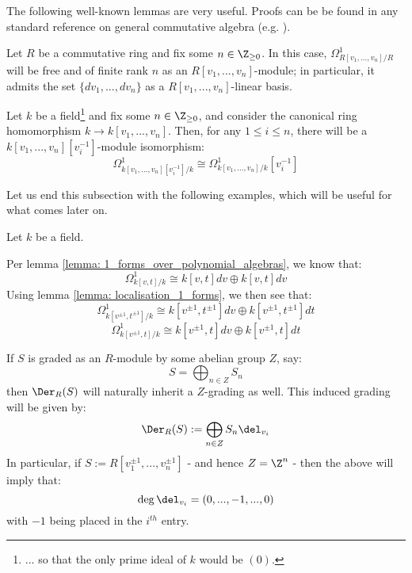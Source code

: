         The following well-known lemmas are very useful. Proofs can be be found in any standard reference on general commutative algebra (e.g. \cite[\href{https://stacks.math.columbia.edu/tag/00AO}{Tag 00AO}]{stacks}).
        \begin{lemma} \label{lemma: 1_forms_over_polynomial_algebras}
            \cite[\href{https://stacks.math.columbia.edu/tag/00RX}{Tag 00RX}]{stacks} Let $R$ be a commutative ring and fix some $n \in \Z_{\geq 0}$. In this case, $\Omega^1_{R[v_1, ..., v_n]/R}$ will be free and of finite rank $n$ as an $R[v_1, ..., v_n]$-module; in particular, it admits the set $\{dv_1, ..., dv_n\}$ as a $R[v_1, ..., v_n]$-linear basis.
        \end{lemma}
        \begin{lemma} \label{lemma: localisation_1_forms}
            \cite[\href{https://stacks.math.columbia.edu/tag/031G}{Tag 031G}]{stacks} Let $k$ be a field\footnote{... so that the only prime ideal of $k$ would be $(0)$.} and fix some $n \in \Z_{\geq 0}$, and consider the canonical ring homomorphism $k \to k[v_1, ..., v_n]$. Then, for any $1 \leq i \leq n$, there will be a $k[v_1, ..., v_n][v_i^{-1}]$-module isomorphism:
                $$\Omega^1_{k[v_1, ..., v_n][v_i^{-1}]/k} \cong \Omega^1_{k[v_1, ..., v_n]/k}[v_i^{-1}]$$
        \end{lemma}

        Let us end this subsection with the following examples, which will be useful for what comes later on.
        \begin{example}
            Let $k$ be a field.
        
            Per lemma \ref{lemma: 1_forms_over_polynomial_algebras}, we know that:
                $$\Omega^1_{k[v, t]/k} \cong k[v, t] dv \oplus k[v, t] dv$$
            Using lemma \ref{lemma: localisation_1_forms}, we then see that:
                $$\Omega^1_{k[v^{\pm 1}, t^{\pm 1}]/k} \cong k[v^{\pm 1}, t^{\pm 1}] dv \oplus k[v^{\pm 1}, t^{\pm 1}] dt$$
                $$\Omega^1_{k[v^{\pm 1}, t]/k} \cong k[v^{\pm 1}, t] dv \oplus k[v^{\pm 1}, t] dt$$
        \end{example}

        \begin{remark} \label{remark: gradings_on_derivations}
            If $S$ is graded as an $R$-module by some abelian group $Z$, say:
                $$S = \bigoplus_{n \in Z} S_n$$
            then $\Der_R(S)$ will naturally inherit a $Z$-grading as well. This induced grading will be given by:
                $$\Der_R(S) := \bigoplus_{n \in Z} S_n \del_{v_i}$$
            In particular, if $S := R[v_1^{\pm 1}, ..., v_n^{\pm 1}]$ - and hence $Z = \Z^n$ - then the above will imply that:
                $$\deg \del_{v_i} = (0, ..., -1, ..., 0)$$
            with $-1$ being placed in the $i^{th}$ entry.
        \end{remark}

